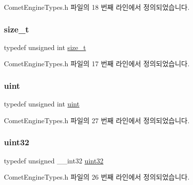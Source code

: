 Comet\+Engine\+Types.\+h 파일의 18 번째 라인에서 정의되었습니다.

\mbox{\label{namespace_comet_engine_1_1_type_a7c94ea6f8948649f8d181ae55911eeaf}} 
\subsubsection{\texorpdfstring{size\+\_\+t}{size\_t}}
{\footnotesize\ttfamily typedef unsigned int \hyperlink{namespace_comet_engine_1_1_type_a7c94ea6f8948649f8d181ae55911eeaf}{size\+\_\+t}}



Comet\+Engine\+Types.\+h 파일의 17 번째 라인에서 정의되었습니다.

\mbox{\label{namespace_comet_engine_1_1_type_a91ad9478d81a7aaf2593e8d9c3d06a14}} 
\subsubsection{\texorpdfstring{uint}{uint}}
{\footnotesize\ttfamily typedef unsigned int \hyperlink{namespace_comet_engine_1_1_type_a91ad9478d81a7aaf2593e8d9c3d06a14}{uint}}



Comet\+Engine\+Types.\+h 파일의 27 번째 라인에서 정의되었습니다.

\mbox{\label{namespace_comet_engine_1_1_type_ada4c95a4173a4bb540c8a7f80f3665d2}} 
\subsubsection{\texorpdfstring{uint32}{uint32}}
{\footnotesize\ttfamily typedef unsigned \+\_\+\+\_\+int32 \hyperlink{namespace_comet_engine_1_1_type_ada4c95a4173a4bb540c8a7f80f3665d2}{uint32}}



Comet\+Engine\+Types.\+h 파일의 26 번째 라인에서 정의되었습니다.

